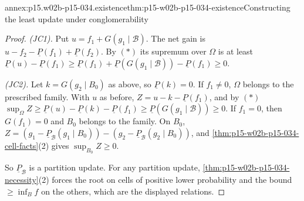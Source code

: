 \begin{annexitem}{annex:p15.w02b-p15-034.existence}{thm:p15-w02b-p15-034-existence}{Constructing the least update under conglomerability}
\begin{proof}
\emph{(JC1).} Put \(u=f_1+G(g_1\mid\mathcal B)\). The net gain is
\(u-f_2-\underline P(f_1)+\underline P(f_2)\). By \((*)\) its supremum over
\(\Omega\) is at least
\(\underline P(u)-\underline P(f_1)
\geq\underline P(f_1)+\underline P(G(g_1\mid\mathcal B))-\underline P(f_1)\geq0\).

\emph{(JC2).} Let \(k=G(g_2\mid B_0)\) as above, so
\(\underline P(k)=0\). If \(f_1\ne0\), \(\Omega\) belongs to the prescribed
family. With \(u\) as before, \(Z=u-k-\underline P(f_1)\), and by \((*)\)
\(\sup_\Omega Z\geq\underline P(u)-\underline P(k)-\underline P(f_1)
\geq\underline P(G(g_1\mid\mathcal B))\geq0\). If \(f_1=0\), then
\(G(f_1)=0\) and \(B_0\) belongs to the family. On \(B_0\),
\(Z=(g_1-\underline P_{\mathcal B}(g_1\mid B_0))-(g_2-\underline P_{\mathcal B}(g_2\mid B_0))\),
and \cref{thm:p15-w02b-p15-034-cell-facts}(2) gives
\(\sup_{B_0}Z\geq0\).

So \(\underline P_{\mathcal B}\) is a partition update. For any partition
update, \cref{thm:p15-w02b-p15-034-necessity}(2) forces the root on cells of
positive lower probability and the bound \(\geq\inf_Bf\) on the others,
which are the displayed relations.
\end{proof}
\end{annexitem}

